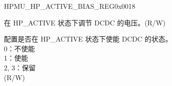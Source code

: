 \begin{register}{H}{PMU\_HP\_ACTIVE\_BIAS\_REG}{0x0018}\label{regdesc:PMUHPACTIVEBIASREG}
%
%
%
%
\regnewline%
\begin{regdesc}\begin{reglist}
\label{fielddesc:PMUHPACTIVEDCMVSET}\item [PMU\_HP\_ACTIVE\_DCM\_VSET]  在 HP\_ACTIVE 状态下调节 DCDC 的电压。(R/W)   \label{fielddesc:PMUHPACTIVEDCMMODE}\item [PMU\_HP\_ACTIVE\_DCM\_MODE] 配置是否在 HP\_ACTIVE 状态下使能 DCDC 的状态。\\
0：不使能 \\
1：使能 \\
2, 3：保留\\
(R/W)
\end{reglist}\end{regdesc}
\end{register}


